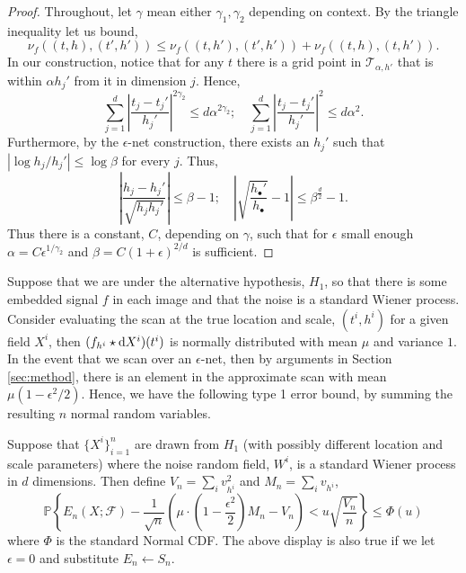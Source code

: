 \begin{proof}
Throughout, let $\gamma$ mean either $\gamma_1, \gamma_2$ depending on context.  By the triangle inequality let us bound,
$$
\nu_f((t,h),(t',h')) \le \nu_f((t,h'),(t',h')) + \nu_f((t,h),(t,h')).
$$
In our construction, notice that for any $t$ there is a grid point in $\mathcal T_{\alpha,h'}$ that is within $\alpha h_j'$ from it in dimension $j$.
Hence,
$$
\sum_{j=1}^d \left| \frac{t_j-t_j'}{h_j'} \right|^{2 \gamma_2} \le d \alpha^{2\gamma_2}; \quad \sum_{j=1}^d \left| \frac{t_j-t_j'}{h_j'} \right|^{2} \le d \alpha^2.
$$
Furthermore, by the $\epsilon$-net construction, there exists an $h_j'$ such that $|\log h_j / h_j'| \le \log \beta$ for every $j$.
Thus,
$$
\left| \frac{h_j - h_j'}{\sqrt{h_j h_j'}} \right| \le \beta - 1; \quad \left| \sqrt{\frac{h_\bullet'}{h_\bullet}} - 1 \right| \le \beta^{\frac d2} - 1.
$$
Thus there is a constant, $C$, depending on $\gamma$, such that for $\epsilon$ small enough
$
\alpha = C \epsilon^{1/\gamma_2} 
$
and 
$
\beta = C (1 + \epsilon)^{2/d}
$
is sufficient.
\end{proof}

Suppose that we are under the alternative hypothesis, $H_1$, so that there is some embedded signal $f$ in each image and that the noise is a standard Wiener process.
Consider evaluating the scan at the true location and scale, $(t^i,h^i)$ for a given field $X^i$, then
$(f_{h^i} \star {\rm d} X^i)(t^i)$ is normally distributed with mean $\mu$ and variance $1$.
In the event that we scan over an $\epsilon$-net, then by arguments in Section \ref{sec:method}, there is an element in the approximate scan with mean $\mu(1 - \epsilon^2 /2)$.
Hence, we have the following type 1 error bound, by summing the resulting $n$ normal random variables.

\begin{proposition}
Suppose that $\{X^i\}_{i=1}^n$ are drawn from $H_1$ (with possibly different location and scale parameters) where the noise random field, $W^i$, is a standard Wiener process in $d$ dimensions.
Then define $V_n = \sum_i v_{h^i}^2$ and $M_n = \sum_i v_{h^i}$,
$$
\mathbb P \left\{ E_{n}(X;\mathcal F) - \frac{1}{\sqrt n} \left( \mu \cdot \left(1 - \frac{\epsilon^2}{2}\right) M_n - V_n \right) < u \sqrt{\frac{V_n}{n}} \right\} \le \Phi(u)
$$
where $\Phi$ is the standard Normal CDF.  
The above display is also true if we let $\epsilon = 0$ and substitute $E_{n} \gets S_n$.
\end{proposition}

